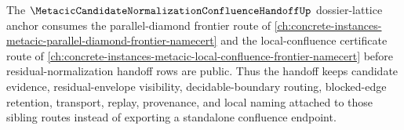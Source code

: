 The $\MetacicCandidateNormalizationConfluenceHandoffUp$ dossier-lattice anchor consumes the parallel-diamond frontier route of \autoref{ch:concrete-instances-metacic-parallel-diamond-frontier-namecert} and the local-confluence certificate route of \autoref{ch:concrete-instances-metacic-local-confluence-frontier-namecert} before residual-normalization handoff rows are public. Thus the handoff keeps candidate evidence, residual-envelope visibility, decidable-boundary routing, blocked-edge retention, transport, replay, provenance, and local naming attached to those sibling routes instead of exporting a standalone confluence endpoint.

